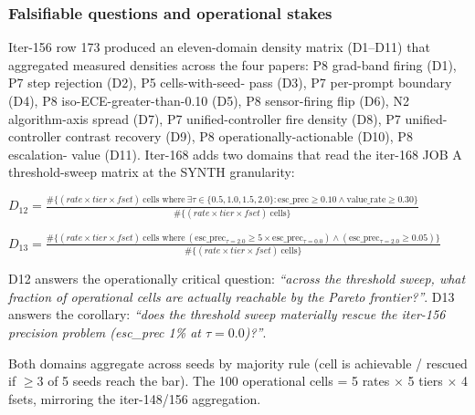
\subsubsection{Falsifiable questions and operational stakes}
Iter-156 row 173 produced an eleven-domain density matrix (D1--D11)
that aggregated measured densities across the four papers: P8
grad-band firing (D1), P7 step rejection (D2), P5 cells-with-seed-
pass (D3), P7 per-prompt boundary (D4), P8 iso-ECE-greater-than-0.10
(D5), P8 sensor-firing flip (D6), N2 algorithm-axis spread (D7), P7
unified-controller fire density (D8), P7 unified-controller contrast
recovery (D9), P8 operationally-actionable (D10), P8 escalation-
value (D11). Iter-168 adds two domains that read the iter-168 JOB A
threshold-sweep matrix at the SYNTH granularity:

  $D_{12} = \frac{\#\{(rate \times tier \times fset)\ \text{cells where}\ \exists \tau \in \{0.5, 1.0, 1.5, 2.0\} : \text{esc\_prec} \geq 0.10 \wedge \text{value\_rate} \geq 0.30\}}{\#\{(rate \times tier \times fset)\ \text{cells}\}}$

  $D_{13} = \frac{\#\{(rate \times tier \times fset)\ \text{cells where}\ (\text{esc\_prec}_{\tau=2.0} \geq 5 \times \text{esc\_prec}_{\tau=0.0}) \wedge (\text{esc\_prec}_{\tau=2.0} \geq 0.05)\}}{\#\{(rate \times tier \times fset)\ \text{cells}\}}$

D12 answers the operationally critical question: \emph{``across the
threshold sweep, what fraction of operational cells are actually
reachable by the Pareto frontier?''}. D13 answers the corollary:
\emph{``does the threshold sweep materially rescue the iter-156
precision problem (esc\_prec 1\% at $\tau=0.0$)?''}.

Both domains aggregate across seeds by majority rule (cell is
achievable / rescued if $\geq 3$ of 5 seeds reach the bar). The 100
operational cells = 5 rates $\times$ 5 tiers $\times$ 4 fsets,
mirroring the iter-148/156 aggregation.

